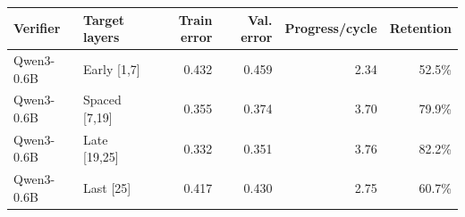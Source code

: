 \begin{tabular}{llrrrr}
\toprule
Verifier & Target layers & Train error & Val. error & Progress/cycle & Retention \\
\midrule
Qwen3-0.6B & Early [1,7] & 0.432 & 0.459 & 2.34 & 52.5\% \\
Qwen3-0.6B & Spaced [7,19] & 0.355 & 0.374 & 3.70 & 79.9\% \\
Qwen3-0.6B & Late [19,25] & 0.332 & 0.351 & 3.76 & 82.2\% \\
Qwen3-0.6B & Last [25] & 0.417 & 0.430 & 2.75 & 60.7\% \\
\bottomrule
\end{tabular}
